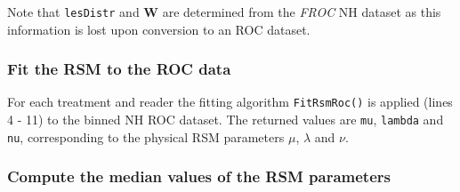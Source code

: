 \documentclass[
]{book}
\newenvironment{Shaded}{\begin{snugshade}}{\end{snugshade}}
\newcommand{\AttributeTok}[1]{\textcolor[rgb]{0.77,0.63,0.00}{#1}}
\newcommand{\CommentTok}[1]{\textcolor[rgb]{0.56,0.35,0.01}{\textit{#1}}}
\newcommand{\ControlFlowTok}[1]{\textcolor[rgb]{0.13,0.29,0.53}{\textbf{#1}}}
\newcommand{\DecValTok}[1]{\textcolor[rgb]{0.00,0.00,0.81}{#1}}
\newcommand{\FunctionTok}[1]{\textcolor[rgb]{0.00,0.00,0.00}{#1}}
\newcommand{\NormalTok}[1]{#1}
\newcommand{\OtherTok}[1]{\textcolor[rgb]{0.56,0.35,0.01}{#1}}
\newcommand{\SpecialCharTok}[1]{\textcolor[rgb]{0.00,0.00,0.00}{#1}}
\begin{document}
Note that \texttt{lesDistr} and \(\textbf{W}\) are determined from the \emph{FROC} NH dataset as this information is lost upon conversion to an ROC dataset.

\hypertarget{fit-the-rsm-to-the-roc-data}{%
\subsubsection{Fit the RSM to the ROC data}\label{fit-the-rsm-to-the-roc-data}}

For each treatment and reader the fitting algorithm \texttt{FitRsmRoc()} is applied (lines 4 - 11) to the binned NH ROC dataset. The returned values are \texttt{mu}, \texttt{lambda} and \texttt{nu}, corresponding to the physical RSM parameters \({\mu}\), \({\lambda}\) and \({\nu}\).

\begin{Shaded}
\end{Shaded}

\hypertarget{compute-the-median-values-of-the-rsm-parameters}{%
\subsubsection{Compute the median values of the RSM parameters}\label{compute-the-median-values-of-the-rsm-parameters}}
\end{document}
